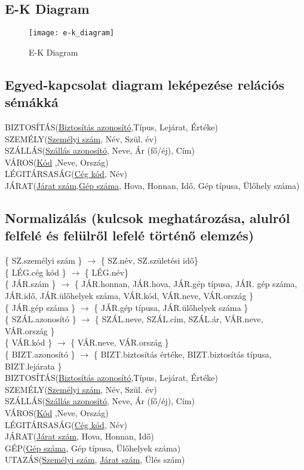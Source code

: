 \subsection{E-K Diagram}

\begin{figure}[!htb]

    \centering
    \texttt{[image: e-k\_diagram]}
    \caption{\label{fig:e-k_diagram}E-K Diagram}

\end{figure}
\pagebreak
\subsection{Egyed-kapcsolat diagram leképezése relációs sémákká}

    BIZTOSÍTÁS(\underline{Biztosítás azonosító},Típus, Lejárat, Értéke)\\
    SZEMÉLY(\underline{Személyi szám}, Név, Szül. év)\\
    SZÁLLÁS(\underline{Szállás azonosító}, Neve, Ár (fő/éj), Cím)\\
    VÁROS(\underline{Kód} ,Neve, Ország)\\
    LÉGITÁRSASÁG(\underline{Cég kód}, Név)\\
    JÁRAT(\underline{Járat szám},\underline{Gép száma}, Hova, Honnan, Idő, Gép típusa, Ülőhely száma)

\subsection{Normalizálás (kulcsok meghatározása, alulról felfelé és felülről lefelé történő elemzés)}

\{ SZ.személyi szám \} $\rightarrow$ \{ SZ.név, SZ.születési idő\} \\
\{ LÉG.cég kód \} $\rightarrow$ \{ LÉG.név\} \\
\{ JÁR.szám \} $\rightarrow$ \{ JÁR.honnan, JÁR.hova, JÁR.gép típusa, JÁR. gép száma, JÁR.idő, JÁR.ülőhelyek száma, VÁR.kód, VÁR.neve, VÁR.ország \} \\
\{ JÁR.gép száma \} $\rightarrow$ \{ JÁR.gép típusa, JÁR.ülőhelyek száma \} \\
\{ SZÁL.azonosító \} $\rightarrow$ \{ SZÁL.neve, SZÁL.cím, SZÁL.ár, VÁR.neve, VÁR.ország \} \\
\{ VÁR.kód \} $\rightarrow$ \{ VÁR.neve, VÁR.ország \} \\
\{ BIZT.azonosító \} $\rightarrow$ \{ BIZT.biztosítás értéke, BIZT.biztosítás típusa, BIZT.lejárata \} \\
BIZTOSÍTÁS(\underline{Biztosítás azonosító},Típus, Lejárat, Értéke)\\
SZEMÉLY(\underline{Személyi szám}, Név, Szül. év)\\
SZÁLLÁS(\underline{Szállás azonosító}, Neve, Ár (fő/éj), Cím)\\
VÁROS(\underline{Kód} ,Neve, Ország)\\
LÉGITÁRSASÁG(\underline{Cég kód}, Név)\\
JÁRAT(\underline{Járat szám}, Hova, Honnan, Idő)\\
GÉP(\underline{Gép száma}, Gép típusa, Ülőhelyek száma)\\
UTAZÁS(\underline{Személyi szám}, \underline{Járat szám}, Ülés szám)

